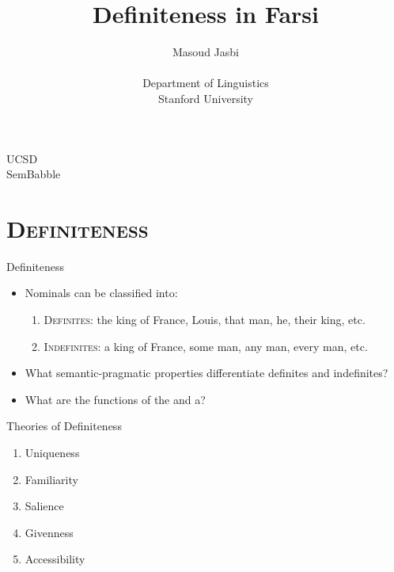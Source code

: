 \documentclass[10pt]{beamer}
\begin{document}

\begin{frame}
\title{Definiteness in Farsi}
\author{Masoud Jasbi \\ ~ \\ {\small Department of Linguistics} \\ {\small Stanford University} }       	
\date{}
\titlepage

{\scriptsize UCSD \\ SemBabble}
\end{frame}


\section {\scshape Definiteness}

\begin {frame} {Definiteness}

	\begin {itemize}
	\item Nominals can be classified into:
	\begin {enumerate}
	\item \textsc{Definites}: \alert{the} king of France, Louis, that man, he, their king, etc.
	\item \textsc{Indefinites}: \alert{a} king of France, some man, any man, every man, etc.
	\end {enumerate}
	\item What semantic-pragmatic properties differentiate definites and indefinites? \pause
	\item What are the functions of \alert{the} and \alert{a}?
	\end {itemize}

\end {frame}
\begin {frame} {Theories of Definiteness}

	\begin {enumerate}
	\item \alert{Uniqueness} {\scriptsize \hfill \citep{russell1905denoting, abbott1999support}}
	\item \alert{Familiarity} {\scriptsize \hfill \citep{heim1982semantics, christophersen1939articles, prince1992zpg}}
	\item Salience {\scriptsize \hfill \citep{lewis1979scorekeeping, von1997salience}}
	\item Givenness {\scriptsize \hfill \citep{gundel1993cognitive}}
	\item Accessibility {\scriptsize \hfill \citep{ariel1990accessing, ariel2001accessibility}}
	\end {enumerate}

\end {frame}
\end{document}
